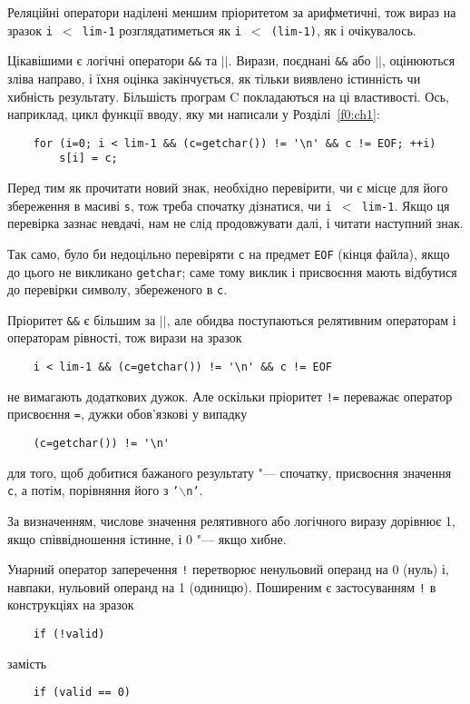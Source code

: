 \documentclass[a4paper,12pt]{book}
\begin{document}
  Реляційні оператори наділені меншим пріоритетом за арифметичні, тож вираз на зразок
  \texttt{i \mbox{$<$} lim-1} розглядатиметься як \texttt{i \mbox{$<$} (lim-1)}, як і
  очікувалось.
  
  Цікавішими є логічні оператори \texttt{\&\&} та \texttt{\mbox{$|$}\mbox{$|$}}. Вирази,
  поєднані \texttt{\&\&} або \texttt{\mbox{$|$}\mbox{$|$}}, оцінюються зліва направо, і
  їхня оцінка закінчується, як тільки виявлено істинність чи хибність результату.
  Більшість програм C покладаються на ці властивості. Ось, наприклад, цикл функції вводу,
  яку ми написали у Розділі~\ref{f0:ch1}:
  \begin{verbatim}
    for (i=0; i < lim-1 && (c=getchar()) != '\n' && c != EOF; ++i)
        s[i] = c;
  \end{verbatim}

  Перед тим як прочитати новий знак, необхідно перевірити, чи є місце для його збереження
  в масиві \texttt{s}, тож треба спочатку дізнатися, чи \texttt{i \mbox{$<$} lim-1}. Якщо ця
  перевірка зазнає невдачі, нам не слід продовжувати далі, і читати наступний знак.

  Так само, було би недоцільно перевіряти \texttt{c} на предмет \texttt{EOF} (кінця
  файла), якщо до цього не викликано \texttt{getchar}; саме тому виклик і присвоєння мають
  відбутися до перевірки символу, збереженого в \texttt{c}.

  Пріоритет \texttt{\&\&} є більшим за \texttt{\mbox{$|$}\mbox{$|$}}, але обидва поступаються
  релятивним операторам і операторам рівності, тож вирази на зразок
  \begin{verbatim}
    i < lim-1 && (c=getchar()) != '\n' && c != EOF
  \end{verbatim}
  не вимагають додаткових дужок. Але оскільки пріоритет \texttt{!=} переважає оператор
  присвоєння \texttt{=}, дужки обов'язкові у випадку
  \begin{verbatim}
    (c=getchar()) != '\n'
  \end{verbatim}
  для того, щоб добитися бажаного результату "--- спочатку, присвоєння значення
  \texttt{c}, а потім, порівняння його з \texttt{'\mbox{$\backslash$}n'}.

  За визначенням, числове значення релятивного або логічного виразу дорівнює 1, якщо
  співвідношення істинне, і 0 "--- якщо хибне.

  Унарний оператор заперечення \texttt{!} перетворює ненульовий операнд на 0 (нуль) і,
  навпаки, нульовий операнд на 1 (одиницю). Поширеним є застосуванням \texttt{!} в
  конструкціях на зразок
  \begin{verbatim}
    if (!valid)
  \end{verbatim}
  замість
  \begin{verbatim}
    if (valid == 0)
  \end{verbatim}
\end{document}
